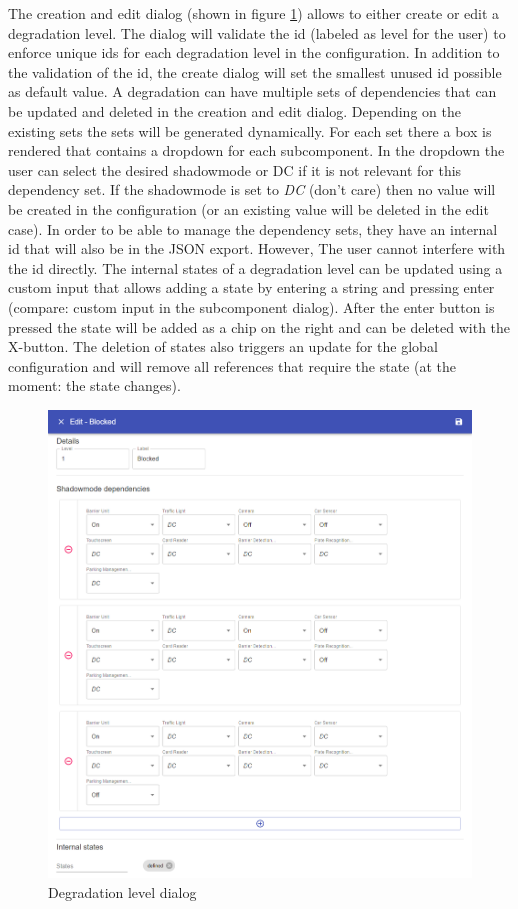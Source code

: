 The creation and edit dialog (shown in figure \ref{fig:degradation_level_dialog}) allows to either create or edit a degradation level. The dialog will validate the id (labeled as level for the user) to enforce unique ids for each degradation level in the configuration. In addition to the validation of the id, the create dialog will set the smallest unused id possible as default value. 
A degradation can have multiple sets of dependencies that can be updated and deleted in the creation and edit dialog. Depending on the existing sets the sets will be generated dynamically.
For each set there a box is rendered that contains a dropdown for each subcomponent. In the dropdown the user can select the desired shadowmode or DC if it is not relevant for this dependency set. If the shadowmode is set to \textit{DC} (don't care) then no value will be created in the configuration (or an existing value will be deleted in the edit case). In order to be able to manage the dependency sets, they have an internal id that will also be in the JSON export. However, The user cannot interfere with the id directly. The internal states of a degradation level can be updated using a custom input that allows adding a state by entering a string and pressing enter (compare: custom input in the subcomponent dialog). After the enter button is pressed the state will be added as a chip on the right and can be deleted with the X-button. The deletion of states also triggers an update for the global configuration and will remove all references that require the state (at the moment: the state changes).

\begin{figure}[ht]
    \centering
    \includegraphics[width=\textwidth]{img/degradation_level_dialog.png}
    \caption{Degradation level dialog}
    \label{fig:degradation_level_dialog}
\end{figure}

